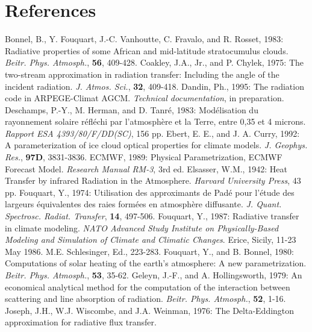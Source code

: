 \section{References}
\label{section5}
%
\decrefname
Bonnel, B., Y. Fouquart, J.-C. Vanhoutte, C. Fravalo, and R. Rosset, 1983:
      Radiative properties of some African and mid-latitude stratocumulus
      clouds.
      {\it Beitr. Phys. Atmosph.},
      {\bf 56},
      409-428.
\decrefname
Coakley, J.A., Jr., and P. Chylek, 1975:
      The two-stream approximation in radiation transfer: Including the angle
      of the incident radiation.
      {\it J. Atmos. Sci.},
      {\bf 32},
      409-418.
\decrefname
Dandin, Ph., 1995:
      The radiation code in ARPEGE-Climat AGCM.
      {\it Technical documentation},
      in preparation.
\decrefname
Deschamps, P.-Y., M. Herman, and D. Tanr\'e, 1983:
      Mod\'elisation du rayonnement solaire r\'efl\'echi par l'atmosph\`ere et
      la Terre, entre 0,35 et 4 microns.
      {\it Rapport ESA 4393/80/F/DD(SC)},
      156 pp.
\decrefname
Ebert, E. E., and J. A. Curry, 1992:
      A parameterization of ice cloud optical properties for climate models.
      {\it J. Geophys. Res.},
      {\bf 97D},
      3831-3836.
\decrefname
ECMWF, 1989:
      Physical Parametrization, ECMWF Forecast Model.
      {\it Research Manual RM-3},
      3rd ed.
\decrefname
Elsasser, W.M., 1942:
      Heat Transfer by infrared Radiation in the Atmosphere.
      {\it Harvard University Press},
      43 pp.
\decrefname
Fouquart, Y., 1974:
      Utilisation des approximants de Pad\'e pour l'\'etude des largeurs
      \'equivalentes des raies form\'ees en atmosph\`ere diffusante.
      {\it J. Quant. Spectrosc. Radiat. Transfer},
      {\bf 14},
      497-506.
\decrefname
Fouquart, Y., 1987:
      Radiative transfer in climate modeling.
      {\it NATO Advanced Study Institute on Physically-Based Modeling and
      Simulation of Climate and Climatic Changes}.
      Erice, Sicily, 11-23 May 1986. M.E. Schlesinger, Ed.,
      223-283.
\decrefname
Fouquart, Y., and B. Bonnel, 1980:
      Computations of solar heating of the earth's atmosphere: A new
      parametrization.
      {\it Beitr. Phys. Atmosph.},
      {\bf 53},
      35-62.
\decrefname
Geleyn, J.-F., and A. Hollingsworth, 1979:
      An economical analytical method for the computation of the interaction
      between scattering and line absorption of radiation.
      {\it Beitr. Phys. Atmosph.},
      {\bf 52},
      1-16.
\decrefname
Joseph, J.H., W.J. Wiscombe, and J.A. Weinman, 1976:
      The Delta-Eddington approximation for radiative flux transfer.
